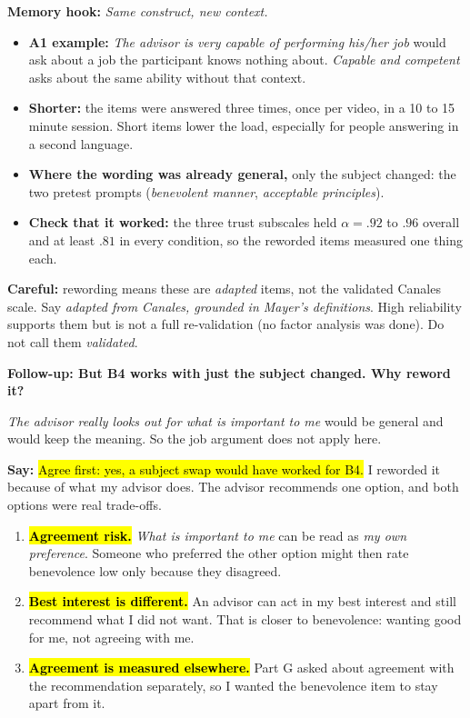\documentclass[11pt,a4paper]{article}
\newcommand{\key}[1]{\hl{#1}}
\newcommand{\hook}[1]{{\setlength{\fboxsep}{1.5pt}\colorbox{hlyellow}{\color{black}#1}}}
\newcommand{\say}[1]{\begin{tcolorbox}[colback=knlight,colframe=knblue,boxrule=0.5pt,left=6pt,right=6pt,top=4pt,bottom=4pt]\textbf{Say:} #1\end{tcolorbox}}
\newcommand{\careful}[1]{{\color{knred}\textbf{Careful:} #1}\par}
\begin{document}
{\small\color{kngrey}\textbf{Memory hook:} \hook{\emph{Same construct, new context.}}}

\begin{itemize}
  \item \textbf{A1 example:} \emph{The advisor is very capable of performing his/her job} would ask about a job the participant knows nothing about. \emph{Capable and competent} asks about the same ability without that context.
  \item \textbf{Shorter:} the items were answered three times, once per video, in a 10 to 15 minute session. Short items lower the load, especially for people answering in a second language.
  \item \textbf{Where the wording was already general,} only the subject changed: the two pretest prompts (\emph{benevolent manner}, \emph{acceptable principles}).
  \item \textbf{Check that it worked:} the three trust subscales held $\alpha=.92$ to $.96$ overall and at least $.81$ in every condition, so the reworded items measured one thing each.
\end{itemize}
\careful{rewording means these are \emph{adapted} items, not the validated Canales scale. Say \emph{adapted from Canales, grounded in Mayer's definitions}. High reliability supports them but is not a full re-validation (no factor analysis was done). Do not call them \emph{validated}.}
\vspace{0.4em}

{\bfseries\color{knblue}Follow-up: But B4 works with just the subject changed. Why reword it?}\par\vspace{0.2em}

{\small\emph{The advisor really looks out for what is important to me} would be general and would keep the meaning. So the job argument does not apply here.}

\say{\key{Agree first: yes, a subject swap would have worked for B4.} I reworded it because of what my advisor does. The advisor recommends one option, and both options were real trade-offs.
\begin{enumerate}[leftmargin=1.4em,itemsep=0.1em,topsep=0.2em]
  \item \key{\textbf{Agreement risk.}} \emph{What is important to me} can be read as \emph{my own preference}. Someone who preferred the other option might then rate benevolence low only because they disagreed.
  \item \key{\textbf{Best interest is different.}} An advisor can act in my best interest and still recommend what I did not want. That is closer to benevolence: wanting good for me, not agreeing with me.
  \item \key{\textbf{Agreement is measured elsewhere.}} Part G asked about agreement with the recommendation separately, so I wanted the benevolence item to stay apart from it.
\end{enumerate}}
\end{document}
